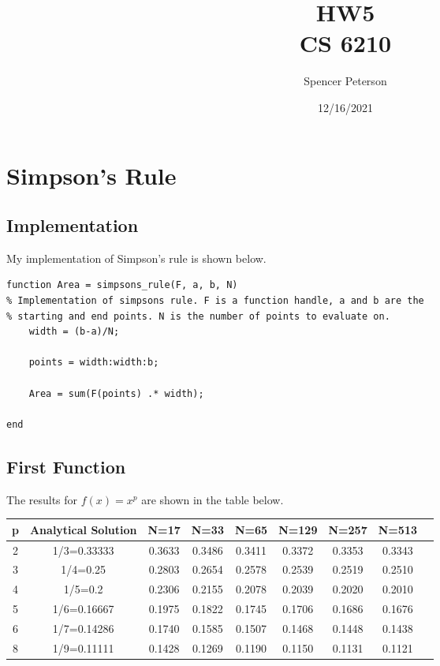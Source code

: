 \documentclass{article}
\title{HW5 \\
	\large CS 6210}
\date{12/16/2021}
\author{Spencer Peterson}
\begin{document}
\maketitle

\section{Simpson's Rule}

\subsection{Implementation}

My implementation of Simpson's rule is shown below. 
\begin{verbatim}
function Area = simpsons_rule(F, a, b, N)
% Implementation of simpsons rule. F is a function handle, a and b are the
% starting and end points. N is the number of points to evaluate on. 
    width = (b-a)/N;

    points = width:width:b;

    Area = sum(F(points) .* width);

end
\end{verbatim}

\subsection{First Function}

The results for $f(x)  =x^p$ are shown in the table below.

\begin{center}
	\begin{tabular}{|c|c|c|c|c|c|c|c|c}
	\hline
p & Analytical Solution	& N=17 & N=33 & N=65 & N=129 & N=257 & N=513 \\ \hline
2 & 1/3=0.33333&	0.3633	&  0.3486&    0.3411  &  0.3372  & 0.3353  &  0.3343\\\hline
3 & 1/4=0.25	&	0.2803	&    0.2654 &   0.2578  &  0.2539&0.2519  &  0.2510\\ \hline
4 & 1/5=0.2&	0.2306	& 0.2155 &   0.2078 &   0.2039   & 0.2020&    0.2010\\ \hline
5 & 1/6=0.16667&	0.1975	&   0.1822 &   0.1745  &  0.1706 &   0.1686&    0.1676\\ \hline
6 & 1/7=0.14286&	0.1740	&   0.1585  & 0.1507  &  0.1468&    0.1448  &  0.1438\\ \hline
8 & 1/9=0.11111&	0.1428	&   0.1269  &  0.1190 &   0.1150  &  0.1131   & 0.1121 \\ \hline
	\end{tabular}
\end{center}
\end{document}
